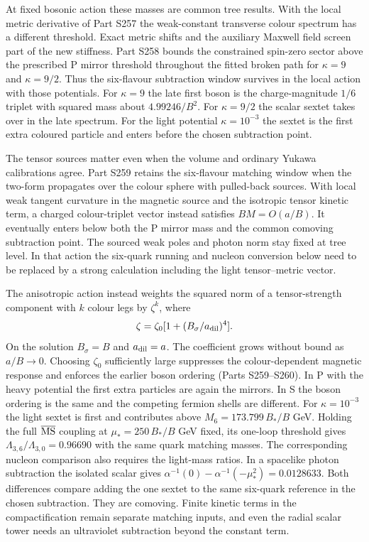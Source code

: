 \documentclass[aps,prd,reprint,onecolumn,nofootinbib,amsmath,amssymb]{revtex4-2}
\begin{document}
At fixed bosonic action these masses are common tree results. With the local metric derivative of Part S257 the weak-constant transverse colour spectrum has a different threshold. Exact metric shifts and the auxiliary Maxwell field screen part of the new stiffness. Part S258 bounds the constrained spin-zero sector above the prescribed P mirror threshold throughout the fitted broken path for $\kappa=9$ and $\kappa=9/2$. Thus the six-flavour subtraction window survives in the local action with those potentials. For $\kappa=9$ the late first boson is the charge-magnitude $1/6$ triplet with squared mass about $4.99246/B^2$. For $\kappa=9/2$ the scalar sextet takes over in the late spectrum. For the light potential $\kappa=10^{-3}$ the sextet is the first extra coloured particle and enters before the chosen subtraction point.

The tensor sources matter even when the volume and ordinary Yukawa calibrations agree. Part S259 retains the six-flavour matching window when the two-form propagates over the colour sphere with pulled-back sources. With local weak tangent curvature in the magnetic source and the isotropic tensor kinetic term, a charged colour-triplet vector instead satisfies $BM=O(a/B)$. It eventually enters below both the P mirror mass and the common comoving subtraction point. The sourced weak poles and photon norm stay fixed at tree level. In that action the six-quark running and nucleon conversion below need to be replaced by a strong calculation including the light tensor--metric vector.

The anisotropic action instead weights the squared norm of a tensor-strength component with $k$ colour legs by $\zeta^k$, where
\begin{equation}
 \zeta=\zeta_0[1+(B_\sigma/a_{\rm dil})^4].
\end{equation}
On the solution $B_\sigma=B$ and $a_{\rm dil}=a$. The coefficient grows without bound as $a/B\to0$. Choosing $\zeta_0$ sufficiently large suppresses the colour-dependent magnetic response and enforces the earlier boson ordering (Parts S259--S260). In P with the heavy potential the first extra particles are again the mirrors. In S the boson ordering is the same and the competing fermion shells are different. For $\kappa=10^{-3}$ the light sextet is first and contributes above $M_6=173.799\,B_*/B$ GeV. Holding the full $\overline{\rm MS}$ coupling at $\mu_*=250\,B_*/B$ GeV fixed, its one-loop threshold gives $\Lambda_{3,6}/\Lambda_{3,0}=0.96690$ with the same quark matching masses. The corresponding nucleon comparison also requires the light-mass ratios. In a spacelike photon subtraction the isolated scalar gives $\alpha^{-1}(0)-\alpha^{-1}(-\mu_*^2)=0.0128633$. Both differences compare adding the one sextet to the same six-quark reference in the chosen subtraction. They are comoving. Finite kinetic terms in the compactification remain separate matching inputs, and even the radial scalar tower needs an ultraviolet subtraction beyond the constant term.
\end{document}
